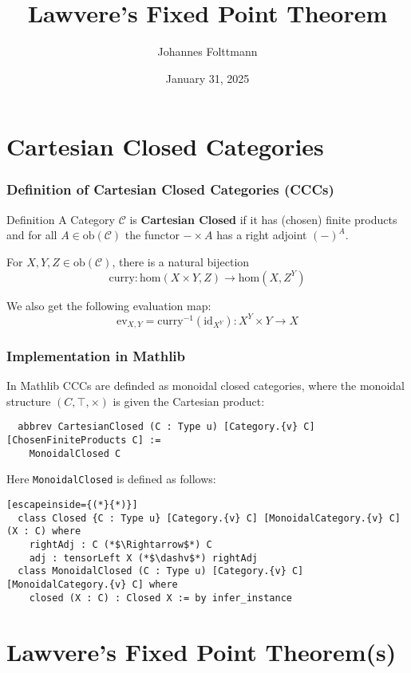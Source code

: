 \documentclass{beamer}
\title{Lawvere's Fixed Point Theorem}
\author{Johannes Folttmann}
\institute{P4A1}
\date{January 31, 2025}
\begin{document}
\frame{\titlepage}

\section{Cartesian Closed Categories}

\begin{frame}
  \frametitle{Definition of Cartesian Closed Categories (CCCs)}
  \begin{block}{Definition}
    A Category $\mathcal{C}$ is \textbf{Cartesian Closed} if it has (chosen) finite products and for all $A \in \text{ob}(\mathcal{C})$ the functor $- \times A$ has a right adjoint $(-)^{A}$.
  \end{block}

  For $X, Y, Z \in \text{ob}(\mathcal{C})$, there is  a natural bijection
  \[\text{curry} : \text{hom}(X \times Y, Z) \rightarrow \text{hom}(X, Z ^ Y)\]

  We also get the following evaluation map:
  \[\text{ev}_{X,Y} = \text{curry}^{-1} (\text{id}_{X ^ Y}) : X ^ Y \times Y \rightarrow X\]
\end{frame}

\begin{frame}[fragile]
  \frametitle{Implementation in Mathlib}
  In Mathlib CCCs are definded as monoidal closed categories, where the monoidal structure $(C, \top, \times)$ is given the Cartesian product:
  \begin{lstlisting}
  abbrev CartesianClosed (C : Type u) [Category.{v} C] [ChosenFiniteProducts C] :=
    MonoidalClosed C
  \end{lstlisting}
  Here \texttt{MonoidalClosed} is defined as follows:
  \begin{lstlisting}[escapeinside={(*}{*)}]
  class Closed {C : Type u} [Category.{v} C] [MonoidalCategory.{v} C] (X : C) where
    rightAdj : C (*$\Rightarrow$*) C
    adj : tensorLeft X (*$\dashv$*) rightAdj
  class MonoidalClosed (C : Type u) [Category.{v} C] [MonoidalCategory.{v} C] where
    closed (X : C) : Closed X := by infer_instance
  \end{lstlisting}

\end{frame}

\section{Lawvere's Fixed Point Theorem(s)}
\end{document}
